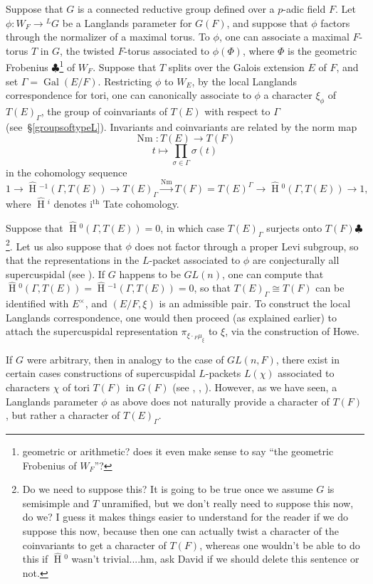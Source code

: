 \documentclass[11pt]{amsart}
\theoremstyle{plain}
\newcommand{\MAxxx}[1]{$\clubsuit$\footnote{#1}}
\newcommand{\HT}[1]{\hat{\HH}{}^{#1}}
\theoremstyle{definition}
\DeclareMathOperator{\Gal}{Gal}
\DeclareMathOperator{\HH}{H}
\DeclareMathOperator{\Nm}{Nm}
\begin{document}
Suppose that $G$ is a connected reductive group defined over a
$p$-adic field $F$.  Let $\phi : W_F \rightarrow {}^L G$ be a
Langlands parameter for $G(F)$, and suppose that $\phi$ factors
through the normalizer of a maximal torus. To $\phi$, one can
associate a maximal $F$-torus $T$ in $G$, the twisted $F$-torus
associated to $\phi(\Phi)$, where $\Phi$ is the geometric Frobenius
\MAxxx{geometric or arithmetic?  does it even make sense to say ``the
  geometric Frobenius of $W_F$''?} of $W_F$.  Suppose that $T$ splits
over the Galois extension $E$ of $F$, and set $\Gamma = \Gal(E/F)$.
Restricting $\phi$ to $W_E$, by the local Langlands correspondence for
tori, one can canonically associate to $\phi$ a character $\xi_{\phi}$
of $T(E)_{\Gamma}$, the group of coinvariants of $T(E)$ with respect
to $\Gamma$ (see~\S\ref{groupsoftypeL}).  Invariants and coinvariants
are related by the norm map
$$\Nm : T(E) \rightarrow T(F)$$ $$t \mapsto \displaystyle\prod_{\sigma \in \Gamma} \sigma(t)$$
in the cohomology sequence
$$1 \rightarrow \HT{-1}(\Gamma,T(E)) \rightarrow T(E)_{\Gamma} \xrightarrow{\Nm} T(F)
= T(E)^{\Gamma} \rightarrow \HT{0}(\Gamma,T(E)) \rightarrow 1,$$
where $\HT{i}$ denotes $\mathrm{i}^{\mathrm{th}}$ Tate cohomology.

Suppose that $\HT{0}(\Gamma, T(E)) = 0$, in which case
$T(E)_{\Gamma}$ surjects onto $T(F)$\MAxxx{Do we need to suppose this?
It is going to be true once we assume $G$ is semisimple and $T$
unramified, but we don't really need to suppose this now, do we?  I guess
it makes things easier to understand for the reader if we do suppose this
now, because then one can actually twist a character of the coinvariants
to get a character of $T(F)$, whereas one wouldn't be able to do this
if $\HT{0}$ wasn't trivial....hm, ask David if we should delete this
sentence or not.}.  Let us also suppose that
$\phi$ does not factor through a proper Levi subgroup, so that the
representations in the $L$-packet associated to $\phi$ are
conjecturally all supercuspidal (see \cite[\S 3.5]{debackerreeder}).
If $G$ happens to be $GL(n)$, one can compute that
$\HT{0}(\Gamma, T(E)) = \HT{-1}(\Gamma, T(E)) = 0$, so that
$T(E)_{\Gamma} \cong T(F)$ can be identified with $E^{\times}$, and
$(E/F, \xi)$ is an admissible pair.  To construct the local Langlands
correspondence, one would then proceed (as explained earlier) to
attach the supercuspidal representation $\pi_{\xi \cdot {}_F
  \mu_{\xi}}$ to $\xi$, via the construction of Howe.

If $G$ were arbitrary, then in analogy to the case of $GL(n,F)$, there
exist in certain cases constructions of supercuspidal $L$-packets
$L(\chi)$ associated to characters $\chi$ of tori $T(F)$ in $G(F)$ (see
\cite{debackerreeder}, \cite{kaletha}, \cite{reeder}).  However, as we
have seen, a Langlands parameter $\phi$ as above does not naturally
provide a character of $T(F)$, but rather a character of
$T(E)_{\Gamma}$.
\end{document}
